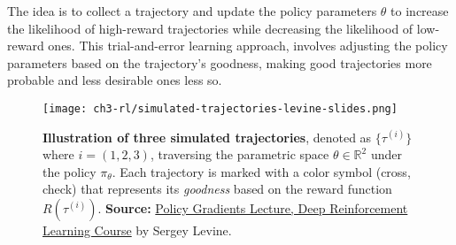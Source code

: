 
The idea is to collect a trajectory and update the policy parameters $\theta$ to increase the likelihood of high-reward trajectories while decreasing the likelihood of low-reward ones. This trial-and-error learning approach, involves adjusting the policy parameters based on the trajectory's goodness, making good trajectories more probable and less desirable ones less so.
\begin{figure}[ht]
    \centering
    \texttt{[image: ch3-rl/simulated-trajectories-levine-slides.png]}
    \captionsetup{width=\textwidth} %
    \caption{\textbf{Illustration of three simulated trajectories}, denoted as $\{\tau^{(i)}\}$ where $i=(1,2,3)$, traversing the parametric space $\theta\in\mathbb{R}^2$ under the policy $\pi_{\theta}$. Each trajectory is marked with a color symbol (cross, check) that represents its \textit{goodness} based on the reward function $R(\tau^{(i)})$. \textbf{Source:} \href{https://rail.eecs.berkeley.edu/deeprlcourse/}{Policy Gradients Lecture, Deep Reinforcement Learning Course} by Sergey Levine.}
    \label{fig:anatomy-rl-trajectories}
  \end{figure}

